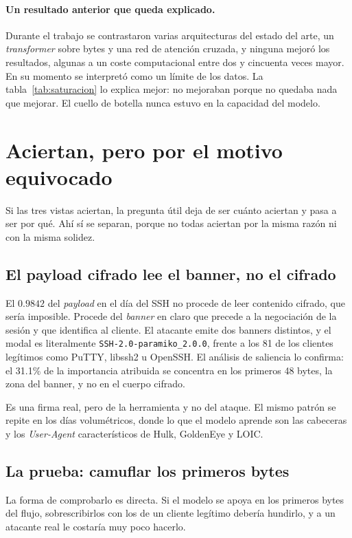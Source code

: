 \paragraph{Un resultado anterior que queda explicado.} Durante el trabajo se
contrastaron varias arquitecturas del estado del arte, un \emph{transformer}
sobre bytes y una red de atención cruzada, y ninguna mejoró los resultados,
algunas a un coste computacional entre dos y cincuenta veces mayor. En su
momento se interpretó como un límite de los datos. La
tabla~\ref{tab:saturacion} lo explica mejor: no mejoraban porque no quedaba nada
que mejorar. El cuello de botella nunca estuvo en la capacidad del modelo.

\section{Aciertan, pero por el motivo equivocado}
\label{sec:motivo-equivocado}

Si las tres vistas aciertan, la pregunta útil deja de ser cuánto aciertan y pasa
a ser por qué. Ahí sí se separan, porque no todas aciertan por la misma razón ni
con la misma solidez.

\subsection*{El payload cifrado lee el banner, no el cifrado}

El $0.9842$ del \emph{payload} en el día del SSH no procede de leer contenido
cifrado, que sería imposible. Procede del \emph{banner} en claro que precede a
la negociación de la sesión y que identifica al cliente. El atacante emite dos
banners distintos, y el modal es literalmente
\texttt{SSH-2.0-paramiko\_2.0.0}, frente a los 81 de los clientes legítimos como
PuTTY, libssh2 u OpenSSH. El análisis de saliencia lo confirma: el 31.1\% de la
importancia atribuida se concentra en los primeros 48 bytes, la zona del banner,
y no en el cuerpo cifrado.

Es una firma real, pero de la herramienta y no del ataque. El mismo patrón se
repite en los días volumétricos, donde lo que el modelo aprende son las
cabeceras y los \emph{User-Agent} característicos de Hulk, GoldenEye y LOIC.

\subsection*{La prueba: camuflar los primeros bytes}

La forma de comprobarlo es directa. Si el modelo se apoya en los primeros bytes
del flujo, sobrescribirlos con los de un cliente legítimo debería hundirlo, y a
un atacante real le costaría muy poco hacerlo.

